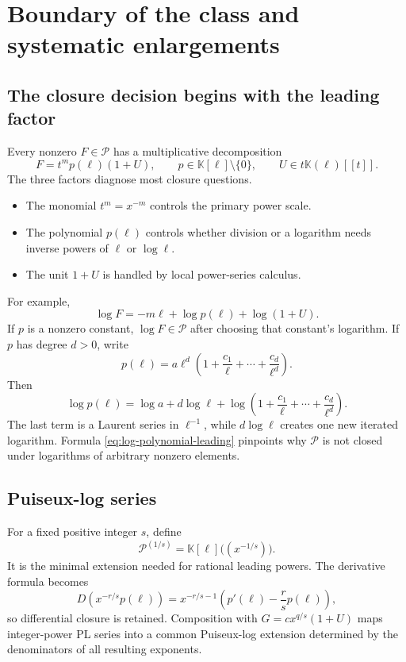 \documentclass[11pt,oneside]{article}
\numberwithin{equation}{section}
\theoremstyle{definition}
\newcommand{\K}{\mathbb K}
\newcommand{\PL}{\mathscr P}
\begin{document}
\section{Boundary of the class and systematic enlargements}\label{sec:extensions}

\subsection{The closure decision begins with the leading factor}

Every nonzero \(F\in\PL\) has a multiplicative decomposition
\begin{equation}\label{eq:PL-factorization}
  F=t^m p(\ell)(1+U),
  \qquad p\in\K[\ell]\setminus\{0\},
  \qquad U\in t\K(\ell)[[t]].
\end{equation}
The three factors diagnose most closure questions.
\begin{itemize}
\item The monomial \(t^m=x^{-m}\) controls the primary power scale.
\item The polynomial \(p(\ell)\) controls whether division or a logarithm needs
  inverse powers of \(\ell\) or \(\log\ell\).
\item The unit \(1+U\) is handled by local power-series calculus.
\end{itemize}

For example,
\begin{equation}\label{eq:log-factorization}
  \log F=-m\ell+\log p(\ell)+\log(1+U).
\end{equation}
If \(p\) is a nonzero constant, \(\log F\in\PL\) after choosing that constant's
logarithm.  If \(p\) has degree \(d>0\), write
\[
  p(\ell)=a\ell^d\left(1+\frac{c_1}{\ell}+\cdots+
  \frac{c_d}{\ell^d}\right).
\]
Then
\begin{equation}\label{eq:log-polynomial-leading}
  \log p(\ell)=\log a+d\log\ell+
  \log\left(1+\frac{c_1}{\ell}+\cdots+
  \frac{c_d}{\ell^d}\right).
\end{equation}
The last term is a Laurent series in \(\ell^{-1}\), while \(d\log\ell\) creates
one new iterated logarithm.  Formula \eqref{eq:log-polynomial-leading} pinpoints
why \(\PL\) is not closed under logarithms of arbitrary nonzero elements.

\subsection{Puiseux-log series}

For a fixed positive integer \(s\), define
\begin{equation}\label{eq:Puiseux-log}
  \PL^{(1/s)}=\K[\ell]\bigl((x^{-1/s})\bigr).
\end{equation}
It is the minimal extension needed for rational leading powers.  The derivative
formula becomes
\begin{equation}\label{eq:Puiseux-derivative}
  D\left(x^{-r/s}p(\ell)\right)
  =x^{-r/s-1}\left(p'(\ell)-\frac{r}{s}p(\ell)\right),
\end{equation}
so differential closure is retained.  Composition with
\(G=cx^{q/s}(1+U)\) maps integer-power PL series into a common Puiseux-log
extension determined by the denominators of all resulting exponents.
\end{document}
